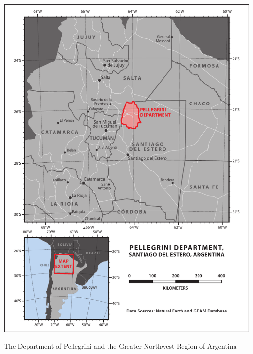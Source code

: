 \begin{ssfigure}
  \centering
  \includegraphics[width=\textwidth]{Graphics/argentinaOverview.pdf}
  \caption{The Department of Pellegrini and the Greater Northwest Region of Argentina}
  \label{map:argentinaOverview}
\end{ssfigure}

